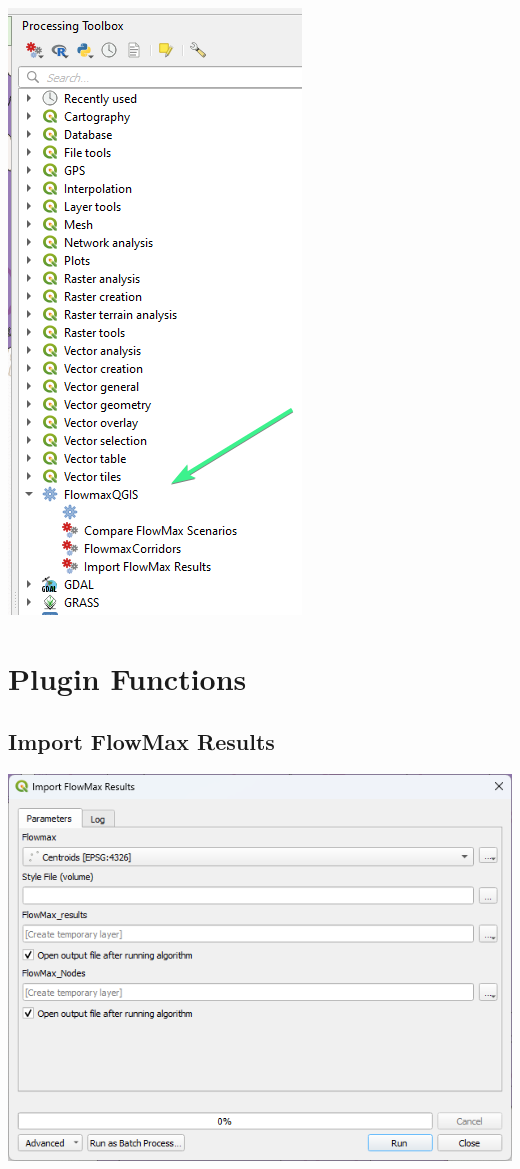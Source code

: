 \documentclass[
]{book}
\begin{document}
\includegraphics{./images/processing.png}

\chapter{Plugin Functions}\label{plugin-functions}

\section{Import FlowMax Results}\label{import-flowmax-results}

\includegraphics{./images/import.png}
\end{document}
